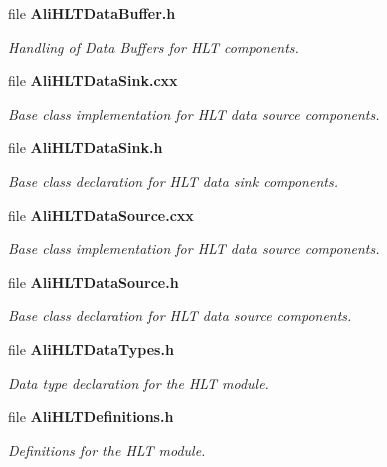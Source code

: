 \begin{CompactItemize}
\item 
file {\bf Ali\-HLTData\-Buffer.h}
\begin{CompactList}\small\item\em Handling of Data Buffers for HLT components. \item\end{CompactList}

\item 
file {\bf Ali\-HLTData\-Sink.cxx}
\begin{CompactList}\small\item\em Base class implementation for HLT data source components. \item\end{CompactList}

\item 
file {\bf Ali\-HLTData\-Sink.h}
\begin{CompactList}\small\item\em Base class declaration for HLT data sink components. \item\end{CompactList}

\item 
file {\bf Ali\-HLTData\-Source.cxx}
\begin{CompactList}\small\item\em Base class implementation for HLT data source components. \item\end{CompactList}

\item 
file {\bf Ali\-HLTData\-Source.h}
\begin{CompactList}\small\item\em Base class declaration for HLT data source components. \item\end{CompactList}

\item 
file {\bf Ali\-HLTData\-Types.h}
\begin{CompactList}\small\item\em Data type declaration for the HLT module. \item\end{CompactList}

\item 
file {\bf Ali\-HLTDefinitions.h}
\begin{CompactList}\small\item\em Definitions for the HLT module. \item\end{CompactList}


\end{CompactItemize}
